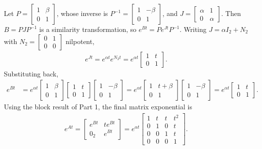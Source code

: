 \documentclass[a4paper, 11pt]{article}
\begin{document}
\begin{solution}
Let $P=\begin{bmatrix} 1&\beta\\ 0&1 \end{bmatrix}$, whose inverse is $P^{-1}=\begin{bmatrix} 1&-\beta\\ 0&1 \end{bmatrix}$, and $J=\begin{bmatrix} \alpha&1\\ 0&\alpha \end{bmatrix}$. Then $B=PJP^{-1}$ is a similarity transformation, so $e^{Bt}=Pe^{Jt}P^{-1}$. Writing $J=\alpha I_2+N_2$ with $N_2=\begin{bmatrix} 0&1\\ 0&0 \end{bmatrix}$ nilpotent,
\begin{align*}
    e^{Jt} = e^{\alpha t}e^{N_2t} = e^{\alpha t}\begin{bmatrix} 1&t\\ 0&1 \end{bmatrix}.
\end{align*}
Substituting back,
\begin{align*}
    e^{Bt} &= e^{\alpha t}\begin{bmatrix} 1&\beta\\ 0&1 \end{bmatrix}\begin{bmatrix} 1&t\\ 0&1 \end{bmatrix}\begin{bmatrix} 1&-\beta\\ 0&1 \end{bmatrix}
    = e^{\alpha t}\begin{bmatrix} 1&t+\beta\\ 0&1 \end{bmatrix}\begin{bmatrix} 1&-\beta\\ 0&1 \end{bmatrix}
    = e^{\alpha t}\begin{bmatrix} 1&t\\ 0&1 \end{bmatrix}.
\end{align*}
Using the block result of Part 1, the final matrix exponential is
\begin{align*}
    e^{At} = \begin{bmatrix} e^{Bt} & te^{Bt}\\ 0_2 & e^{Bt} \end{bmatrix}
    = e^{\alpha t}\begin{bmatrix} 1&t&t&t^2\\ 0&1&0&t\\ 0&0&1&t\\ 0&0&0&1 \end{bmatrix}.
\end{align*}
\end{solution}
\problemend
\end{document}

